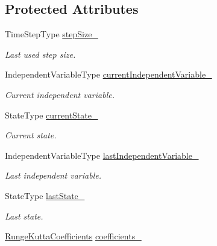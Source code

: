\subsection*{Protected Attributes}
\begin{DoxyCompactItemize}
\item 
Time\+Step\+Type \hyperlink{classtudat_1_1numerical__integrators_1_1RungeKuttaVariableStepSizeIntegrator_a43038f69dbf2e852b547dec2085e5a45}{step\+Size\+\_\+}
\begin{DoxyCompactList}\small\item\em Last used step size. \end{DoxyCompactList}\item 
Independent\+Variable\+Type \hyperlink{classtudat_1_1numerical__integrators_1_1RungeKuttaVariableStepSizeIntegrator_ac89db3054b7e21a3b7ff4dc700d71cfb}{current\+Independent\+Variable\+\_\+}
\begin{DoxyCompactList}\small\item\em Current independent variable. \end{DoxyCompactList}\item 
State\+Type \hyperlink{classtudat_1_1numerical__integrators_1_1RungeKuttaVariableStepSizeIntegrator_a17dc1f0cc72f56c31931142f8d8b87eb}{current\+State\+\_\+}
\begin{DoxyCompactList}\small\item\em Current state. \end{DoxyCompactList}\item 
Independent\+Variable\+Type \hyperlink{classtudat_1_1numerical__integrators_1_1RungeKuttaVariableStepSizeIntegrator_a338e09348505c5e33dd5fa3ab4903d43}{last\+Independent\+Variable\+\_\+}
\begin{DoxyCompactList}\small\item\em Last independent variable. \end{DoxyCompactList}\item 
State\+Type \hyperlink{classtudat_1_1numerical__integrators_1_1RungeKuttaVariableStepSizeIntegrator_a745206698dbef0aa6f9b8ac959be2d03}{last\+State\+\_\+}
\begin{DoxyCompactList}\small\item\em Last state. \end{DoxyCompactList}\item 
\hyperlink{structtudat_1_1numerical__integrators_1_1RungeKuttaCoefficients}{Runge\+Kutta\+Coefficients} \hyperlink{classtudat_1_1numerical__integrators_1_1RungeKuttaVariableStepSizeIntegrator_afa92d7f9d7befc0d9586040ad848c70c}{coefficients\+\_\+}

\end{DoxyCompactItemize}
